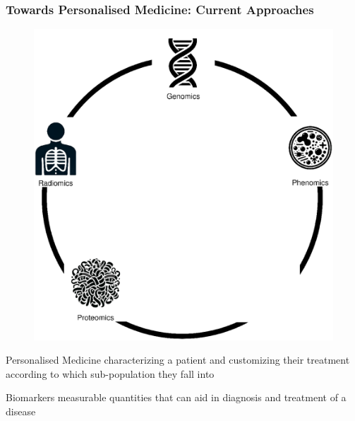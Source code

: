 \documentclass[compress]{beamer}
\begin{document}
\begin{frame}
	\frametitle{Towards Personalised Medicine: Current Approaches}
	\begin{minipage}{0.59\textwidth}
		\begin{figure}[H]
			\includegraphics[width=\textwidth]{images/approaches_current.eps}
		\end{figure}
	\end{minipage} 
	\begin{minipage}{0.39\textwidth}
		\begin{minipage}[t][0.41\paperheight][t]{\textwidth}
			\begin{block}{Personalised Medicine}
				characterizing a patient and customizing their treatment according to which sub-population they fall into	
			\end{block}
		\end{minipage}
		\begin{minipage}[t][0.41\paperheight][t]{\textwidth}
			\begin{block}{Biomarkers}
				measurable quantities that can aid in diagnosis and treatment of a disease
			\end{block}
		\end{minipage}
	\end{minipage}
\end{frame}
\end{document}
